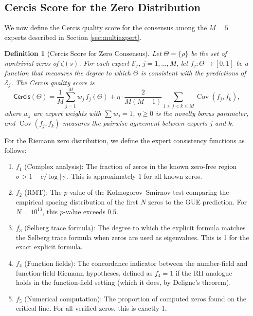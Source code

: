 \documentclass[12pt,a4paper]{article}
\newtheorem{definition}[theorem]{Definition}
\theoremstyle{remark}
\newcommand{\Cercis}{\textsf{Cercis}}
\DeclareMathOperator{\Cov}{Cov}
\begin{document}
\subsection{Cercis Score for the Zero Distribution}
\label{sec:cercis_score}
We now define the Cercis quality score for the consensus among the $M = 5$
experts described in Section \ref{sec:multiexpert}.
\begin{definition}[Cercis Score for Zero Consensus]
\label{def:cercis_zero}
Let $\Theta = \{\rho\}$ be the set of nontrivial zeros of $\zeta(s)$.
For each expert $\mathcal{E}_j$, $j = 1, \ldots, M$, let
$f_j: \Theta \to [0,1]$ be a function that measures the degree to which
$\Theta$ is consistent with the predictions of $\mathcal{E}_j$. The Cercis
quality score is
\begin{equation}
\label{eq:cercis_score}
\Cercis(\Theta) = \frac{1}{M} \sum_{j=1}^{M} w_j \, f_j(\Theta)
+ \eta \cdot \frac{2}{M(M-1)} \sum_{1 \leq j < k \leq M}
\Cov(f_j, f_k),
\end{equation}
where $w_j$ are expert weights with $\sum w_j = 1$, $\eta \geq 0$ is the
novelty bonus parameter, and $\Cov(f_j, f_k)$ measures the pairwise
agreement between experts $j$ and $k$.
\end{definition}
For the Riemann zero distribution, we define the expert consistency
functions as follows:
\begin{enumerate}
  \item $f_1$ (Complex analysis): The fraction of zeros in the known
        zero-free region $\sigma > 1 - c/\log|\gamma|$. This is
        approximately 1 for all known zeros.
  \item $f_2$ (RMT): The $p$-value of the Kolmogorov--Smirnov test comparing
        the empirical spacing distribution of the first $N$ zeros to the
        GUE prediction. For $N = 10^{13}$, this $p$-value exceeds $0.5$.
  \item $f_3$ (Selberg trace formula): The degree to which the explicit
        formula matches the Selberg trace formula when zeros are used as
        eigenvalues. This is 1 for the exact explicit formula.
  \item $f_4$ (Function fields): The concordance indicator between the
        number-field and function-field Riemann hypotheses, defined as
        $f_4 = 1$ if the RH analogue holds in the function-field setting
        (which it does, by Deligne's theorem).
  \item $f_5$ (Numerical computation): The proportion of computed zeros
        found on the critical line. For all verified zeros, this is
        exactly 1.
\end{enumerate}
\end{document}
